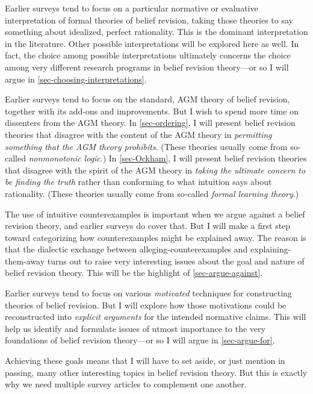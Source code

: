 	\im Earlier surveys tend to focus on a particular normative or evaluative interpretation of formal theories of belief revision, taking those theories to say something about idealized, perfect rationality. This is the dominant interpretation in the literature. Other possible interpretations will be explored here as well. In fact, the choice among possible interpretations ultimately concerns the choice among very different research programs in belief revision theory---or so I will argue in \autoref{sec-choosing-interpretations}. 

	\im Earlier surveys tend to focus on the standard, AGM theory of belief revision, together with its add-ons and improvements. But I wish to spend more time on dissenters from the AGM theory. In \autoref{sec-ordering}, I will present belief revision theories that disagree with the content of the AGM theory in {\em permitting something that the AGM theory prohibits}. (These theories usually come from so-called {\em nonmonotonic logic}.) In \autoref{sec-Ockham}, I will present belief revision theories that disagree with the spirit of the AGM theory in {\em taking the ultimate concern to be finding the truth} rather than conforming to what intuition says about rationality. (These theories usually come from so-called {\em formal learning theory}.) 

	\im The use of intuitive counterexamples is important when we argue against a belief revision theory, and earlier surveys do cover that. But I will make a first step toward categorizing how counterexamples might be explained away. The reason is that the dialectic exchange between alleging-counterexamples and explaining-them-away turns out to raise very interesting issues about the goal and nature of belief revision theory. This will be the highlight of \autoref{sec-argue-against}.  

	\im Earlier surveys tend to focus on various {\em motivated} techniques for constructing theories of belief revision. But I will explore how those motivations could be reconstructed into {\em explicit arguments} for the intended normative claims. This will help us identify and formulate issues of utmost importance to the very foundations of belief revision theory---or so I will argue in \autoref{sec-argue-for}.

\ed Achieving these goals means that I will have to set aside, or just mention in passing, many other interesting topics in belief revision theory. But this is exactly why we need multiple survey articles to complement one another. 

